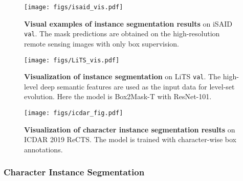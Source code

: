 \documentclass[12pt,onecolumn,letterpaper]{article}
\begin{document}
\begin{table}[t]
\renewcommand\arraystretch{0.90}
\centering
\caption{Object detection performance on the ICDAR2019 ReCTS \texttt{test} dataset. All methods are supervised by horizontal bounding box. The predicted bounding box are generated by the mask prediction.}
\label{tab:icdar}
\end{table}





\begin{figure}[htbp]
\centering      
\texttt{[image: figs/isaid\_vis.pdf]}
\caption{\textbf{Visual examples of instance segmentation results} on iSAID \texttt{val}. The mask predictions are obtained on the high-resolution remote sensing images with only box supervision.}   
\label{fig:remote_sensing}   
\end{figure}

\begin{figure}[t]
\centering
\texttt{[image: figs/LiTS\_vis.pdf]}
\caption{\textbf{Visualization of instance segmentation} on LiTS \texttt{val}. The high-level deep semantic features are used as the input data for level-set evolution. Here the model is Box2Mask-T with ResNet-101.} \label{fig:lits_vis_1}
\end{figure}


\begin{figure}[t]
	\centering   
	\texttt{[image: figs/icdar\_fig.pdf]}
	\caption{\textbf{Visualization of character instance segmentation results} on ICDAR 2019 ReCTS. The model is trained with character-wise box annotations.}   
	\label{fig:icdar}   
\end{figure}

\subsubsection{Character Instance Segmentation}
\end{document}
